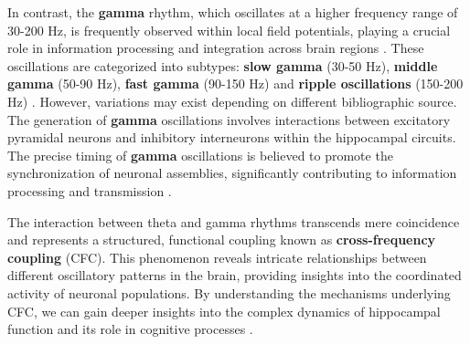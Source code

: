 \documentclass[../main.tex]{subfiles}
\begin{document}
In contrast, the \textbf{gamma} rhythm, which oscillates at a higher frequency range of 30-200 Hz, is frequently observed within local field potentials, playing a crucial role in information processing and integration across brain regions \citep{colgin_rhythms_2016}.
These oscillations are categorized into subtypes: \textbf{slow gamma} (30-50 Hz), \textbf{middle gamma} (50-90 Hz), \textbf{fast gamma} (90-150 Hz) and \textbf{ripple oscillations} (150-200 Hz) \citep{mysin_model_2021}.
However, variations may exist depending on different bibliographic source.
The generation of \textbf{gamma} oscillations involves interactions between excitatory pyramidal neurons and inhibitory interneurons within the hippocampal circuits.
The precise timing of \textbf{gamma} oscillations is believed to promote the synchronization of neuronal assemblies, significantly contributing to information processing and transmission \citep{hyafil_neural_2015}.

The interaction between theta and gamma rhythms transcends mere coincidence and represents a structured, functional coupling known as \textbf{cross-frequency coupling} (CFC).
This phenomenon reveals intricate relationships between different oscillatory patterns in the brain, providing insights into the coordinated activity of neuronal populations.
By understanding the mechanisms underlying CFC, we can gain deeper insights into the complex dynamics of hippocampal function and its role in cognitive processes \citep{jirsa_cross-frequency_2013,hyafil_neural_2015}.
\end{document}
